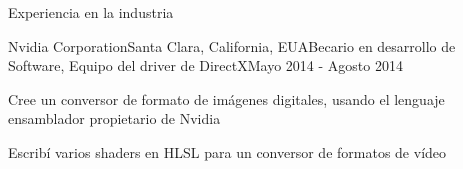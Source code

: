 \documentclass{resume} %
\begin{document}
\begin{rSection}{Experiencia en la industria}
\begin{rSubsection}{Nvidia Corporation}{Santa Clara, California, EUA}{Becario en desarrollo de Software, Equipo del driver de DirectX}{Mayo 2014 - Agosto 2014}
\item Cree un conversor de formato de imágenes digitales, usando el lenguaje ensamblador propietario de Nvidia
\item Escribí varios shaders en HLSL para un conversor de formatos de vídeo
\end{rSubsection}



\end{rSection}

\clearpage
\end{document}
